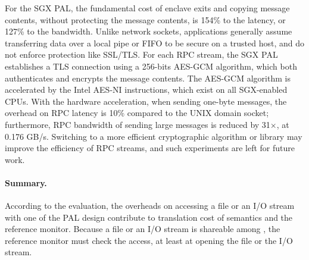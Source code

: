 For the SGX PAL,
the fundamental cost of enclave exits and copying message contents,
without protecting the message contents,
is \roughly{}154\% to the latency,
or \roughly{}127\% to the bandwidth.
Unlike network sockets, 
applications generally assume transferring data over a local pipe or FIFO to be secure on a trusted host, and do not enforce protection like SSL/TLS.
For each RPC stream, the SGX PAL establishes a TLS connection using a 256-bits AES-GCM algorithm, which both authenticates and encrypts the message contents.
The AES-GCM algorithm is accelerated by the Intel AES-NI instructions, which exist on all SGX-enabled CPUs.
With the hardware acceleration,
when sending one-byte messages,
the overhead on RPC latency is \roughly{}10\% compared to the UNIX domain socket;
furthermore, RPC bandwidth of sending large messages
is reduced by \roughly{}31$\times$, at \roughly{}0.176 GB/s.
Switching to a more efficient cryptographic algorithm or library may improve the efficiency of RPC streams,
and such experiments are left for future work.






\paragraph{Summary.}
According to the evaluation, the overheads on accessing a file or an I/O stream
with one of the PAL design
contribute to translation cost of \thehostabi{} semantics
and the reference monitor.
Because a file or an I/O stream
is shareable among \picoprocs{}, the reference monitor
must check the access, at least
at opening the file or the I/O stream.





